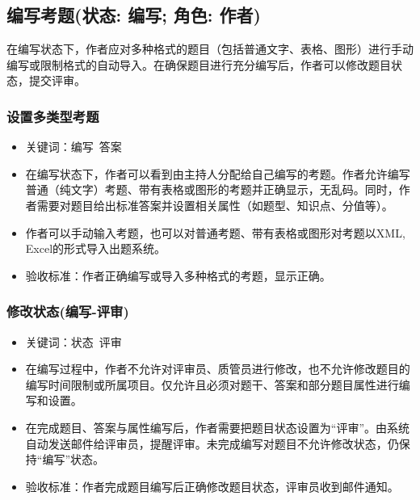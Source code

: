 \documentclass[hyperref, a4paper]{ctexart}
\providecommand{\tightlist}{%
  \setlength{\itemsep}{0pt}\setlength{\parskip}{0pt}}
\begin{document}
\hypertarget{ux7f16ux5199ux8003ux9898ux72b6ux6001-ux7f16ux5199-ux89d2ux8272-ux4f5cux8005}{%
\subsection{编写考题(状态: 编写; 角色:
作者)}\label{ux7f16ux5199ux8003ux9898ux72b6ux6001-ux7f16ux5199-ux89d2ux8272-ux4f5cux8005}}

在编写状态下，作者应对多种格式的题目（包括普通文字、表格、图形）进行手动编写或限制格式的自动导入。在确保题目进行充分编写后，作者可以修改题目状态，提交评审。

\hypertarget{ux8bbeux7f6eux591aux7c7bux578bux8003ux9898}{%
\subsubsection{设置多类型考题}\label{ux8bbeux7f6eux591aux7c7bux578bux8003ux9898}}

\begin{itemize}
\tightlist
\item
  关键词：编写~答案
\item
  在编写状态下，作者可以看到由主持人分配给自己编写的考题。作者允许编写普通（纯文字）考题、带有表格或图形的考题并正确显示，无乱码。同时，作者需要对题目给出标准答案并设置相关属性（如题型、知识点、分值等）。
\item
  作者可以手动输入考题，也可以对普通考题、带有表格或图形对考题以XML,
  Excel的形式导入出题系统。
\item
  验收标准：作者正确编写或导入多种格式的考题，显示正确。
\end{itemize}

\hypertarget{ux4feeux6539ux72b6ux6001ux7f16ux5199-ux8bc4ux5ba1}{%
\subsubsection{修改状态(编写-评审)}\label{ux4feeux6539ux72b6ux6001ux7f16ux5199-ux8bc4ux5ba1}}

\begin{itemize}
\tightlist
\item
  关键词：状态~评审
\item
  在编写过程中，作者不允许对评审员、质管员进行修改，也不允许修改题目的编写时间限制或所属项目。仅允许且必须对题干、答案和部分题目属性进行编写和设置。
\item
  在完成题目、答案与属性编写后，作者需要把题目状态设置为``评审''。由系统自动发送邮件给评审员，提醒评审。未完成编写对题目不允许修改状态，仍保持``编写''状态。
\item
  验收标准：作者完成题目编写后正确修改题目状态，评审员收到邮件通知。
\end{itemize}
\end{document}
